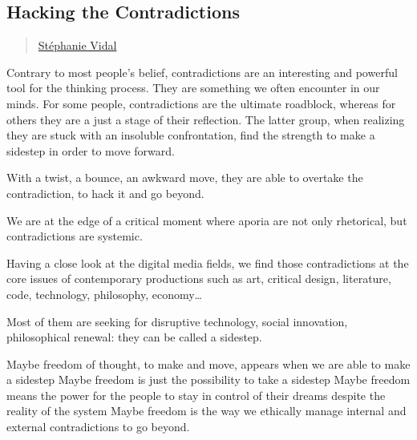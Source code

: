 \subsection{Hacking the
Contradictions}\label{hacking-the-contradictions}

\begin{quote}
\href{../appendix/attributions.html\#stephanie-vidal}{Stéphanie Vidal}
\end{quote}

Contrary to most people's belief, contradictions are an interesting and
powerful tool for the thinking process. They are something we often
encounter in our minds. For some people, contradictions are the ultimate
roadblock, whereas for others they are a just a stage of their
reflection. The latter group, when realizing they are stuck with an
insoluble confrontation, find the strength to make a sidestep in order
to move forward.

With a twist, a bounce, an awkward move, they are able to overtake the
contradiction, to hack it and go beyond.

We are at the edge of a critical moment where aporia are not only
rhetorical, but contradictions are systemic.

Having a close look at the digital media fields, we find those
contradictions at the core issues of contemporary productions such as
art, critical design, literature, code, technology, philosophy,
economy\ldots{}

Most of them are seeking for disruptive technology, social innovation,
philosophical renewal: they can be called a sidestep.

Maybe freedom of thought, to make and move, appears when we are able to
make a sidestep Maybe freedom is just the possibility to take a sidestep
Maybe freedom means the power for the people to stay in control of their
dreams despite the reality of the system Maybe freedom is the way we
ethically manage internal and external contradictions to go beyond.
